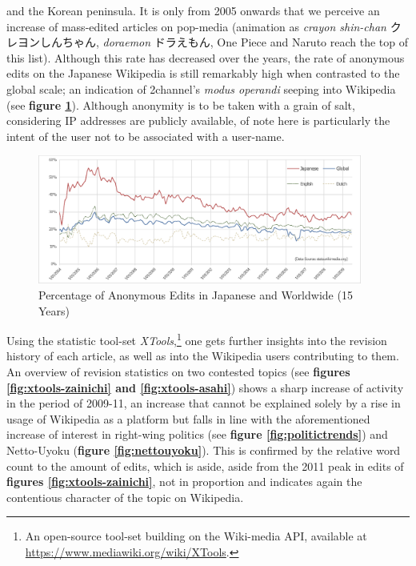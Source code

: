 \documentclass[10pt,british,A4paper,oneside]{memoir}
\begin{document}
and the Korean peninsula. It is only from 2005 onwards that we perceive
an increase of mass-edited articles on pop-media (animation as
\emph{crayon shin-chan} クレヨンしんちゃん, \emph{doraemon} ドラえもん,
One Piece and Naruto reach the top of this list). Although this rate has
decreased over the years, the rate of anonymous edits on the Japanese
Wikipedia is still remarkably high when contrasted to the global scale;
an indication of 2channel's \emph{modus operandi} seeping into Wikipedia
(see \textbf{figure \ref{fig:anon-wiki}}). Although anonymity is to be
taken with a grain of salt, considering IP addresses are publicly
available, of note here is particularly the intent of the user not to be
associated with a user-name.

\begin{figure}[!htb]
 \centering
 \includegraphics[width=0.95\textwidth,trim=4 4 4 4,clip]{images/anon-wiki.eps}
 \centering\caption{Percentage of Anonymous Edits in Japanese and Worldwide (15 Years)}\label{fig:anon-wiki}
\end{figure}

Using the statistic tool-set \emph{XTools},\footnote{An open-source
  tool-set building on the Wiki-media API, available at
  \url{https://www.mediawiki.org/wiki/XTools}.} one gets further
insights into the revision history of each article, as well as into the
Wikipedia users contributing to them. An overview of revision statistics
on two contested topics (see \textbf{figures \ref{fig:xtools-zainichi}
and \ref{fig:xtools-asahi}}) shows a sharp increase of activity in the
period of 2009-11, an increase that cannot be explained solely by a rise
in usage of Wikipedia as a platform but falls in line with the
aforementioned increase of interest in right-wing politics (see
\textbf{figure \ref{fig:politictrends}}) and Netto-Uyoku (\textbf{figure
\ref{fig:nettouyoku}}). This is confirmed by the relative word count to
the amount of edits, which is aside, aside from the 2011 peak in edits
of \textbf{figures \ref{fig:xtools-zainichi}}, not in proportion and
indicates again the contentious character of the topic on Wikipedia.
\end{document}
